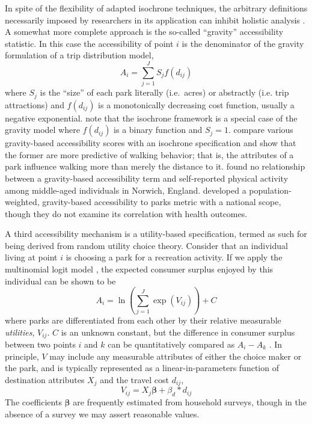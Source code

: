 \documentclass[shortAfour,sageh.bst]{sagej}
\begin{document}
In spite of the flexibility of adapted isochrone techniques, the
arbitrary definitions necessarily imposed by researchers in its
application can inhibit holistic analysis \citep{Logan2017}. A somewhat
more complete approach is the so-called ``gravity'' accessibility
statistic. In this case the accessibility of point \(i\) is the
denominator of the gravity formulation of a trip distribution model,
\begin{equation}\label{eq:gravity}
A_i = \sum_{j = 1}^J S_j f(d_{ij})
\end{equation} where \(S_j\) is the ``size'' of each park literally
(i.e.~acres) or abstractly (i.e. trip attractions) and \(f(d_{ij})\) is
a monotonically decreasing cost function, usually a negative
exponential. \citet{Dong2006} note that the isochrone framework is a
special case of the gravity model where \(f(d_{ij})\) is a binary
function and \(S_j = 1\). \citet{Giles-Corti2005} compare various
gravity-based accessibility scores with an isochrone specification and
show that the former are more predictive of walking behavior; that is,
the attributes of a park influence walking more than merely the distance
to it. \citet{hillsdon2006relationship} found no relationship between a
gravity-based accessibility term and self-reported physical activity
among middle-aged individuals in Norwich, England. \citet{Zhang2011}
developed a population-weighted, gravity-based accessibility to parks
metric with a national scope, though they do not examine its correlation
with health outcomes.

A third accessibility mechanism is a utility-based specification, termed
as such for being derived from random utility choice theory. Consider
that an individual living at point \(i\) is choosing a park for a
recreation activity. If we apply the multinomial logit model
\citep{McFadden1974}, the expected consumer surplus enjoyed by this
individual can be shown to be \begin{equation}\label{eq:utility}
A_i = \ln\left({\sum_{j = 1}^J\exp(V_{ij})}\right) + C
\end{equation} where parks are differentiated from each other by their
relative measurable \emph{utilities}, \(V_{ij}\). \(C\) is an unknown
constant, but the difference in consumer surplus between two points
\(i\) and \(k\) can be quantitatively compared as \(A_i - A_k\)
\citep{Bruce1977}. In principle, \(V\) may include any measurable
attributes of either the choice maker or the park, and is typically
represented as a linear-in-parameters function of destination attributes
\(X_j\) and the travel cost \(d_{ij}\),
\begin{equation}\label{eq:utilityV}
V_{ij} = X_j\boldsymbol{\beta} + \beta_d * d_{ij}
\end{equation} The coefficients \(\boldsymbol{\beta}\) are frequently
estimated from household surveys, though in the absence of a survey we
may assert reasonable values.
\end{document}
